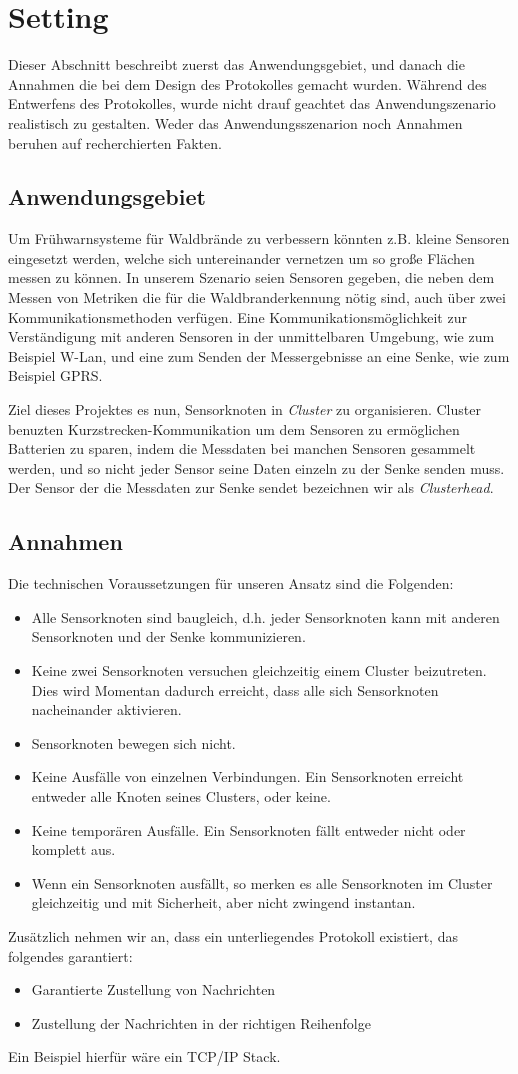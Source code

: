 \section{Setting} \label{sec:setting}
Dieser Abschnitt beschreibt zuerst das Anwendungsgebiet, und danach die Annahmen die bei dem Design des Protokolles gemacht wurden.
W\"ahrend des Entwerfens des Protokolles, wurde nicht drauf geachtet das Anwendungszenario realistisch zu gestalten. Weder das Anwendungsszenarion noch Annahmen beruhen auf recherchierten Fakten.

\subsection{Anwendungsgebiet}
Um Fr\"uhwarnsysteme f\"ur Waldbr\"ande zu verbessern k\"onnten z.B. kleine Sensoren eingesetzt werden, welche sich untereinander vernetzen um so gro\ss e Fl\"achen messen zu k\"onnen.
In unserem Szenario seien Sensoren gegeben, die neben dem Messen von Metriken die f\"ur die Waldbranderkennung n\"otig sind, auch \"uber zwei Kommunikationsmethoden verf\"ugen. Eine Kommunikationsm\"oglichkeit zur Verst\"andigung mit anderen Sensoren in der unmittelbaren Umgebung, wie zum Beispiel W-Lan, und eine zum Senden der Messergebnisse an eine Senke, wie zum Beispiel GPRS.

Ziel dieses Projektes es nun, Sensorknoten in \emph{Cluster} zu organisieren.
Cluster benuzten Kurzstrecken-Kommunikation um dem Sensoren zu erm\"oglichen Batterien zu sparen, indem die Messdaten bei manchen Sensoren gesammelt werden, und so nicht jeder Sensor seine Daten einzeln zu der Senke senden muss.
Der Sensor der die Messdaten zur Senke sendet bezeichnen wir als \emph{Clusterhead}.

\subsection{Annahmen}
Die technischen Voraussetzungen f\"ur unseren Ansatz sind die Folgenden:
\begin{itemize}
\item Alle Sensorknoten sind baugleich, d.h. jeder Sensorknoten kann mit anderen Sensorknoten und der Senke kommunizieren.
\item Keine zwei Sensorknoten versuchen gleichzeitig einem Cluster beizutreten. Dies wird Momentan dadurch erreicht, dass alle sich Sensorknoten nacheinander aktivieren.
\item Sensorknoten bewegen sich nicht.
\item Keine Ausfälle von einzelnen Verbindungen. Ein Sensorknoten erreicht entweder alle Knoten seines Clusters, oder keine.
\item Keine tempor\"aren Ausf\"alle. Ein Sensorknoten f\"allt entweder nicht oder komplett aus.
\item Wenn ein Sensorknoten ausf\"allt, so merken es alle Sensorknoten im Cluster gleichzeitig und mit Sicherheit, aber nicht zwingend instantan.
\end{itemize}

\noindent Zus\"atzlich nehmen wir an, dass ein unterliegendes Protokoll existiert, das folgendes garantiert:
\begin{itemize}
\item Garantierte Zustellung von Nachrichten
\item Zustellung der Nachrichten in der richtigen Reihenfolge
\end{itemize}
Ein Beispiel hierf\"ur w\"are ein TCP/IP Stack.
